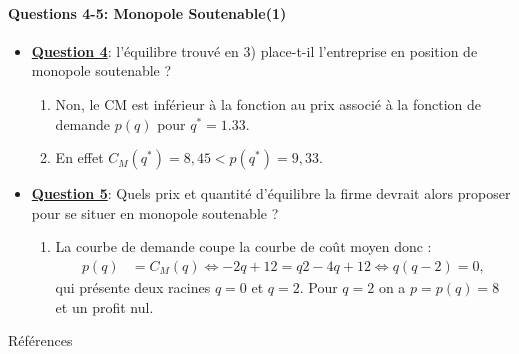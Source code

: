   \begin{frame}
 [allowframebreaks]{\insertsection}
 \framesubtitle{Questions 4-5: Monopole Soutenable(1)}
 \begin{itemize}
 \item \underline{\textbf{Question 4}}: l'équilibre trouvé en 3) place-t-il l’entreprise en position de monopole soutenable ? 
 \begin{enumerate}[$\cdot$]
\item Non, le CM est inférieur à la fonction au prix associé à la fonction de demande $p(q)$  pour $q^*=1.33$.
\item En effet  $C_M(q^*)= 8,45 <  p(q^*) = 9,33$.
 \end{enumerate}
  \item \underline{\textbf{Question 5}}: Quels prix et quantité d'équilibre la firme devrait alors proposer pour se situer en monopole soutenable ?
 \begin{enumerate}[$\cdot$]
\item La courbe de demande coupe la courbe de coût moyen donc :
\begin{align*}
p(q) &= C_M(q) \Leftrightarrow -2q + 12 =q2 - 4q +12  \Leftrightarrow q (q - 2) = 0,
\end{align*}
qui présente deux racines $q=0$ et $q=2$. Pour $q=2$ on a $p = p(q) = 8$ et un profit nul.
\end{enumerate}
  \end{itemize}
 \end{frame}
 
\begin{frame}[allowframebreaks]{Références}


\end{frame}



